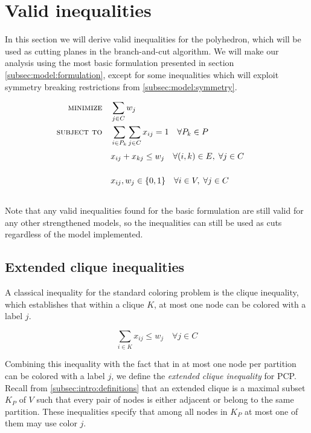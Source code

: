 
\section{Valid inequalities}
\label{sec:ineqs}

In this section we will derive valid inequalities for the \PCP{} polyhedron, which will be used as cutting planes in the branch-and-cut algorithm. We will make our analysis using the most basic formulation presented in section \ref{subsec:model:formulation}, except for some inequalities which will exploit symmetry breaking restrictions from \ref{subsec:model:symmetry}. 

\begin{align}
\text{\textsc{minimize}} \quad & \sum_{j \in C} w_j \nonumber \\
\text{\textsc{subject to}} \quad & \sum_{i \in P_k} \sum_{j \in C} x_{ij} = 1 \quad \forall P_k \in P \nonumber \\
& x_{ij} + x_{kj} \leq w_j \quad \forall (i,k) \in E, \; \forall j \in C \sumheight \nonumber \\
& x_{ij}, w_{j} \in \{0,1\} \quad \forall i \in V, \; \forall j \in C \sumheight \nonumber
\end{align}

Note that any valid inequalities found for the basic formulation are still valid for any other strengthened models, so the inequalities can still be used as cuts regardless of the model implemented.

\subsection{Extended clique inequalities}

A classical inequality for the standard coloring problem is the clique inequality, which establishes that within a clique $K$, at most one node can be colored with a label $j$.

\begin{equation}
\nonumber
\sum_{i \in K} x_{ij} \leq w_{j} \quad \forall j \in C
\end{equation}

Combining this inequality with the fact that in \PCP{} at most one node per partition can be colored with a label $j$, we define the \textit{extended clique inequality} for PCP. Recall from \ref{subsec:intro:definitions} that an extended clique is a maximal subset $K_P$ of $V$ such that every pair of nodes is either adjacent or belong to the same partition. These inequalities specify that among all nodes in $K_P$ at most one of them may use color $j$.

